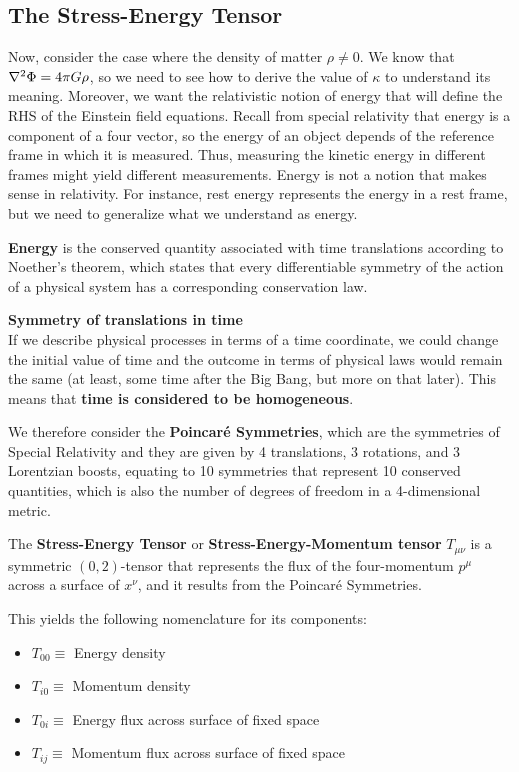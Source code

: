 \documentclass{article}
\begin{document}
 	\subsection{The Stress-Energy Tensor}
 		Now, consider the case where the density of matter $\rho \neq 0$. We know that $\nabla^2 \Phi = 4\pi G \rho$, so we need to see how to derive the value of $\kappa$ to understand its meaning. Moreover, we want the relativistic notion of energy that will define the RHS of the Einstein field equations. Recall from special relativity that energy is a component of a four vector, so the energy of an object depends of the reference frame in which it is measured. Thus, measuring the kinetic energy in different frames might yield different measurements. Energy is not a notion that makes sense in relativity. For instance, rest energy represents the energy in a rest frame, but we need to generalize what we understand as energy.
 		\begin{defn}
 			\textbf{Energy} is the conserved quantity associated with time translations according to Noether's theorem, which states that every differentiable symmetry of the action of a physical system has a corresponding conservation law.
 		\end{defn}
 		\begin{exmp}
 			\textbf{Symmetry of translations in time}\\
 			If we describe physical processes in terms of a time coordinate, we could change the initial value of time and the outcome in terms of physical laws would remain the same (at least, some time after the Big Bang, but more on that later). This means that \textbf{time is considered to be homogeneous}.
 		\end{exmp}
 		We therefore consider the \textbf{Poincar\'{e} Symmetries}, which are the symmetries of Special Relativity and they are given by 4 translations, 3 rotations, and 3 Lorentzian boosts, equating to 10 symmetries that represent 10 conserved quantities, which is also the number of degrees of freedom in a 4-dimensional metric.
 		\begin{defn}
 			The \textbf{Stress-Energy Tensor} or \textbf{Stress-Energy-Momentum tensor} $T_{\mu\nu}$ is a symmetric $(0,2)$-tensor that represents the flux of the four-momentum $p^\mu$ across a surface of $x^\nu$, and it results from the Poincar\'{e} Symmetries.
 		\end{defn}
 		This yields the following nomenclature for its components:
 		\begin{multicols}{2}
 			\begin{itemize}
 				\item $T_{00} \equiv $ Energy density
 				\item $T_{i0} \equiv $ Momentum density\\
 				\item $T_{0i} \equiv $ Energy flux across surface of fixed space
 				\item $T_{ij} \equiv $ Momentum flux across surface of fixed space
 			\end{itemize}
 		\end{multicols}
\end{document}
